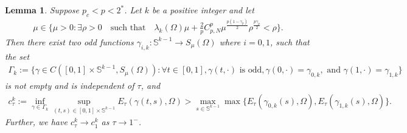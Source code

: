 \documentclass[10pt,a4paper]{article}
\newtheorem{lemma}[theorem]{Lemma}
\theoremstyle{definition} \theoremstyle{remark}
\numberwithin{equation}{section}
\newcommand{\s}{\mathbb{S}}
\newcommand{\la}{\lambda}
\newcommand{\ga}{\gamma}
\begin{document}
\begin{lemma} \label{lemsadpoi}
	Suppose $p_c < p < 2^*$. Let $k$ be a positive integer and let
	\begin{align} \label{eqassumonmu}
		\mu \in \bigl\{\mu > 0: \exists \rho > 0 \quad \text{such that} \quad \la_k(\Omega)\mu + \frac2p C_{p,N}^p \mu^{\frac{p(1-\ga_p)}{2}}\rho ^{\frac{p\ga_p}{2}} < \rho\bigr\}.
	\end{align}
	Then there exist two odd functions $\gamma_{i,k}: \s^{k-1} \to S_\mu(\Omega)$ where $i = 0,1$, such that the set
	\begin{align}
		\Gamma_k := \big\{\gamma \in C([0,1]\times \s^{k-1}, S_\mu(\Omega)): \forall t \in [0,1], \gamma(t,\cdot) \text{ is odd}, \gamma(0,\cdot) = \gamma_{0,k}, \text{ and } \gamma(1,\cdot) = \gamma_{1,k}\big\}
	\end{align}
    is not empty and is independent of $\tau$, and
    \begin{align} \label{eqctauN}
    	c_\tau^k := \inf_{\gamma \in \Gamma_k}\sup_{(t,s) \in [0,1]\times\s^{k-1}}E_\tau(\gamma(t,s),\Omega) > \max_{s\in \s^{k-1}}\max\big\{ E_\tau(\gamma_{0,k}(s),\Omega), E_\tau(\gamma_{1,k}(s),\Omega)\big\}.
    \end{align}
    Further, we have $c^k_\tau \to c^k_1$ as $\tau \to 1^-$.
\end{lemma}
\end{document}

